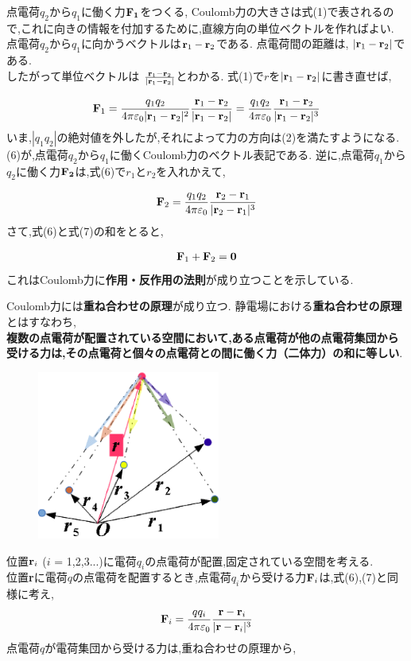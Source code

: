 \documentclass[../main]{subfiles}
\begin{document}
点電荷$q_2$から$q_1$に働く力${\bf F_1}$をつくる,
Coulomb力の大きさは式(1)で表されるので,これに向きの情報を付加するために,直線方向の単位ベクトルを作ればよい.
点電荷$q_2$から$q_1$に向かうベクトルは${\bf r}_1-{\bf r}_2$である.
点電荷間の距離は, $|{\bf r}_1-{\bf r}_2|$である.\\
したがって単位ベクトルは
$\frac{{\bf r}_1-{\bf r}_2}{|{\bf r}_1-{\bf r}_2|}$とわかる.
式(1)で$r$を$|{\bf r}_1-{\bf r}_2|$に書き直せば,

\begin{eqnarray}
{\bf F}_1 =  \frac{q_{1}q_{2}}{4\pi \varepsilon_{0} |{\bf r}_1-{\bf r}_2|^2}\frac{{\bf r}_1-{\bf r}_2}{|{\bf r}_1-{\bf r}_2|} = \frac{q_{1}q_{2}}{4\pi \varepsilon_{0}}\frac{{\bf r}_1-{\bf r}_2}{|{\bf r}_1-{\bf r}_2|^3}
\end{eqnarray}
いま,$|q_1q_2|$の絶対値を外したが,それによって力の方向は(2)を満たすようになる.
(6)が,点電荷$q_2$から$q_1$に働くCoulomb力のベクトル表記である.
逆に,点電荷$q_1$から$q_2$に働く力${\bf F_2}$は,式(6)で$r_1$と$r_2$を入れかえて,

\begin{eqnarray}
{\bf F}_2 = \frac{q_{1}q_{2}}{4\pi \varepsilon_{0}}\frac{{\bf r}_2-{\bf r}_1}{|{\bf r}_2-{\bf r}_1|^3}
\end{eqnarray}
さて,式(6)と式(7)の和をとると,

\begin{eqnarray}
{\bf F}_{1}+{\bf F}_{2}={\bf 0}
\end{eqnarray}
これはCoulomb力に{\bf 作用・反作用の法則}が成り立つことを示している.

Coulomb力には{\bf 重ね合わせの原理}が成り立つ.
静電場における{\bf 重ね合わせの原理}とはすなわち,\\
{\bf 複数の点電荷が配置されている空間において,ある点電荷が他の点電荷集団から受ける力は,その点電荷と個々の点電荷との間に働く力（二体力）の和に等しい}.\\

\begin{figure}[htbp]
 \begin{center}
  \includegraphics[width=60mm]{1.3.eps}
 \end{center}
 \caption{}
 \label{fig:one}
\end{figure}
位置${\bf r}_{i}$ ($i$ = 1,2,3...)に電荷$q_i$の点電荷が配置,固定されている空間を考える.\\
位置{\bf r}に電荷$q$の点電荷を配置するとき,点電荷$q_i$から受ける力${\bf F}_i$は,式(6),(7)と同様に考え,
\begin{eqnarray}
{\bf F}_{i} = \frac{qq_{i}}{4\pi \varepsilon_{0}}\frac{{\bf r}-{\bf r}_i}{|{\bf r}-{\bf r}_i|^3}
\end{eqnarray}
点電荷$q$が電荷集団から受ける力は,重ね合わせの原理から,
\end{document}
